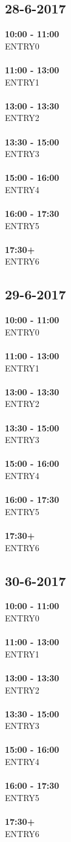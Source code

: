 \documentclass{uva-inf-article}
\begin{document}
\subsection{28-6-2017}
\textbf{10:00 - 11:00}\\
ENTRY0\\\\
\textbf{11:00 - 13:00}\\
ENTRY1\\\\
\textbf{13:00 - 13:30}\\
ENTRY2\\\\
\textbf{13:30 - 15:00}\\
ENTRY3\\\\
\textbf{15:00 - 16:00}\\
ENTRY4\\\\
\textbf{16:00 - 17:30}\\
ENTRY5\\\\
\textbf{17:30+}\\
ENTRY6\\
\subsection{29-6-2017}
\textbf{10:00 - 11:00}\\
ENTRY0\\\\
\textbf{11:00 - 13:00}\\
ENTRY1\\\\
\textbf{13:00 - 13:30}\\
ENTRY2\\\\
\textbf{13:30 - 15:00}\\
ENTRY3\\\\
\textbf{15:00 - 16:00}\\
ENTRY4\\\\
\textbf{16:00 - 17:30}\\
ENTRY5\\\\
\textbf{17:30+}\\
ENTRY6\\
\subsection{30-6-2017}
\textbf{10:00 - 11:00}\\
ENTRY0\\\\
\textbf{11:00 - 13:00}\\
ENTRY1\\\\
\textbf{13:00 - 13:30}\\
ENTRY2\\\\
\textbf{13:30 - 15:00}\\
ENTRY3\\\\
\textbf{15:00 - 16:00}\\
ENTRY4\\\\
\textbf{16:00 - 17:30}\\
ENTRY5\\\\
\textbf{17:30+}\\
ENTRY6\\
\end{document}
